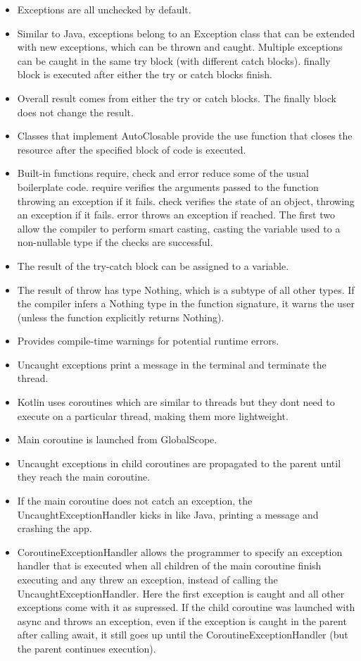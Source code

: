 \documentclass[a4paper,11pt]{article}
\theoremstyle{plain}
\theoremstyle{nonumberplain}
\begin{document}
\begin{itemize}
  \item Exceptions are all unchecked by default.
  \item Similar to Java, exceptions belong to an Exception class that can be extended with new exceptions, which can be thrown and caught. Multiple exceptions can be caught in the same try block (with different catch blocks). finally block is executed after either the try or catch blocks finish.
  \item Overall result comes from either the try or catch blocks. The finally block does not change the result.
  \item Classes that implement AutoClosable provide the use function that closes the resource after the specified block of code is executed.
  \item Built-in functions require, check and error reduce some of the usual boilerplate code. require verifies the arguments passed to the function throwing an exception if it fails. check verifies the state of an object, throwing an exception if it fails. error throws an exception if reached. The first two allow the compiler to perform smart casting, casting the variable used to a non-nullable type if the checks are successful.
  \item The result of the try-catch block can be assigned to a variable.
  \item The result of throw has type Nothing, which is a subtype of all other types. If the compiler infers a Nothing type in the function signature, it warns the user (unless the function explicitly returns Nothing).
  \item Provides compile-time warnings for potential runtime errors.
  \item Uncaught exceptions print a message in the terminal and terminate the thread.
  \item Kotlin uses coroutines which are similar to threads but they dont need to execute on a particular thread, making them more lightweight.
  \item Main coroutine is launched from GlobalScope.
  \item Uncaught exceptions in child coroutines are propagated to the parent until they reach the main coroutine.
  \item If the main coroutine does not catch an exception, the UncaughtExceptionHandler kicks in like Java, printing a message and crashing the app.
  \item CoroutineExceptionHandler allows the programmer to specify an exception handler that is executed when all children of the main coroutine finish executing and any threw an exception, instead of calling the UncaughtExceptionHandler. Here the first exception is caught and all other exceptions come with it as supressed. If the child coroutine was launched with async and throws an exception, even if the exception is caught in the parent after calling await, it still goes up until the CoroutineExceptionHandler (but the parent continues execution).

\end{itemize}
\end{document}
